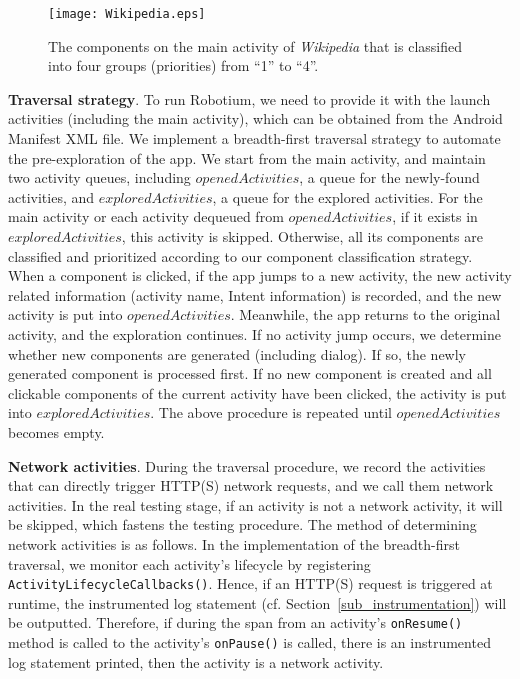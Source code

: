 \documentclass[sigconf,review, anonymous]{acmart}
\begin{document}
\begin{figure}
 \centering
  \texttt{[image: Wikipedia.eps]}
  \caption{The components on the main activity of \textit{Wikipedia} that is classified into four groups (priorities) from ``1'' to ``4''.}
  \label{fig_wikipedia}
\end{figure}

\textbf{Traversal strategy}. To run \textsf{Robotium}, we need to provide it with the launch activities (including the main activity), which can be obtained from the Android Manifest XML file. We implement a breadth-first traversal strategy to automate the pre-exploration of the app. We start from the main activity, and maintain two activity queues, including $openedActivities$, a queue for the newly-found activities, and $exploredActivities$, a queue for the explored activities. For the main activity or each activity dequeued from $openedActivities$, if it exists in $exploredActivities$, this activity is skipped. Otherwise, all its components are classified and prioritized according to our component classification strategy. When a component is clicked, if the app jumps to a new activity, the new activity related information (activity name, Intent information) is recorded, and the new activity is put into $openedActivities$. Meanwhile, the app returns to the original activity, and the exploration continues. If no activity jump occurs, we  determine whether new components are generated (including dialog). If so, the newly generated component is processed first. If no new component is created and all clickable components of the current activity have been clicked, the activity is put into $exploredActivities$. The above procedure is repeated until $openedActivities$ becomes empty.

\textbf{Network activities}. During the traversal procedure, we record the activities that can directly trigger HTTP(S) network requests, and we call them network activities. In the real testing stage, if an activity is not a network activity, it will be skipped, which fastens the testing procedure. The method of determining network activities is as follows. In the implementation of the breadth-first traversal, we monitor each activity's lifecycle by registering \texttt{ActivityLifecycleCallbacks()}. Hence, if an HTTP(S) request is triggered at runtime, the instrumented log statement (cf. Section~\ref{sub_instrumentation}) will be outputted. Therefore, if during the span from an activity's \texttt{onResume()} method is called to the activity's \texttt{onPause()} is called, there is an instrumented log statement printed, then the activity is a network activity.
\end{document}

